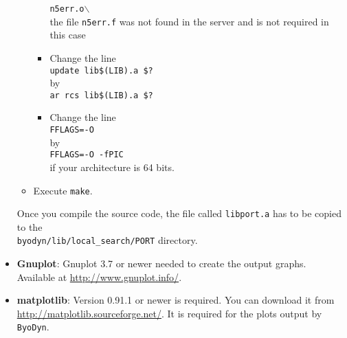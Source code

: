\documentclass[a4paper, 11pt]{article}
\begin{document}
\begin{itemize}
\begin{itemize}
\begin{itemize}
      \texttt{n5err.o$\backslash$}\\[1.5ex]
      the file \texttt{n5err.f} was not found in the server and is not required in this case
    \item
      Change the line\\[1.5ex]
      \texttt{update lib\$(LIB).a \$?}\\[1.5ex]
      by\\[1.5ex]
      \texttt{ar rcs lib\$(LIB).a \$?}
    \item
      Change the line\\[1.5ex]
      \texttt{FFLAGS=-O}\\[1.5ex]
      by\\[1.5ex]
      \texttt{FFLAGS=-O -fPIC}\\[1.5ex]
      if your architecture is 64 bits.
    \end{itemize}
  \item
    Execute \texttt{make}.
  \end{itemize}
  Once you compile the source code, the file called \texttt{libport.a} has to be copied to the \\\texttt{byodyn/lib/local\_search/PORT} directory.
\item
  \textbf{Gnuplot}: Gnuplot 3.7 or newer needed to create the output graphs. 
  Available at \url{http://www.gnuplot.info/}.
\item
  \textbf{matplotlib}: Version 0.91.1 or newer is required.
  You can download it from \url{http://matplotlib.sourceforge.net/}.
  It is required for the plots output by \texttt{ByoDyn}.\\
\end{itemize}
\end{document}
